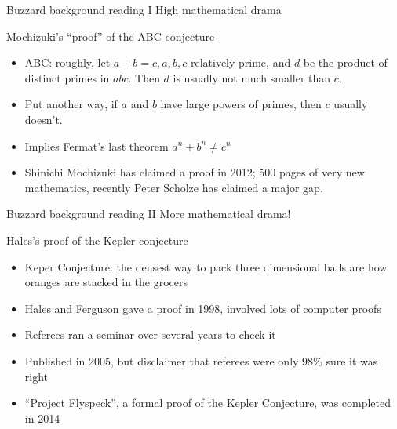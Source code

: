 \documentclass{beamer}
\begin{document}
\begin{frame}{Buzzard background reading I}
High mathematical drama
  \begin{block}{Mochizuki's ``proof'' of the ABC conjecture}
    \begin{itemize}
    \item ABC: roughly, let $a+b=c, a,b,c$ relatively prime, and $d$ be the product of distinct primes in $abc$.  Then $d$ is usually not much smaller than $c$.
    \item Put another way, if $a$ and $b$ have large powers of primes, then $c$ usually doesn't.
    \item Implies Fermat's last theorem $a^n+b^n\neq c^n$
    \item Shinichi Mochizuki has claimed a proof in 2012; 500 pages of very new mathematics, recently Peter Scholze has claimed a major gap.
      \end{itemize}

\end{block}
\end{frame}

\begin{frame}{Buzzard background reading II}
  More mathematical drama!
  \begin{block}{Hales's proof of the Kepler conjecture}
    \begin{itemize}
    \item Keper Conjecture: the densest way to pack three dimensional balls are how oranges are stacked in the grocers
    \item Hales and Ferguson gave a proof in 1998, involved lots of computer proofs
    \item Referees ran a seminar over several years to check it
    \item Published in 2005, but disclaimer that referees were only 98\% sure it was right
    \item ``Project Flyspeck'', a formal proof of the Kepler Conjecture, was completed in 2014
      \end{itemize}

  \end{block}

\end{frame}
\end{document}
